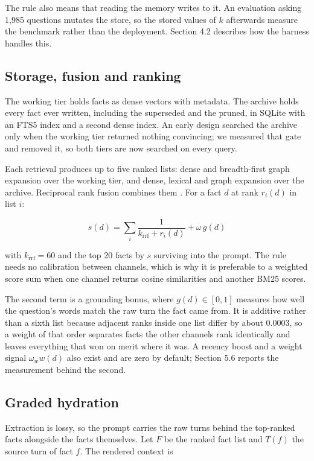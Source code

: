 \documentclass[10pt,a4paper,twocolumn]{article}
\begin{document}
The rule also means that reading the memory writes to it. An evaluation asking 1,985 questions mutates the store, so the stored values of $k$ afterwards measure the benchmark rather than the deployment. Section 4.2 describes how the harness handles this.

\subsection{Storage, fusion and ranking}

The working tier holds facts as dense vectors with metadata. The archive holds every fact ever written, including the superseded and the pruned, in SQLite with an FTS5 index and a second dense index. An early design searched the archive only when the working tier returned nothing convincing; we measured that gate and removed it, so both tiers are now searched on every query.

Each retrieval produces up to five ranked lists: dense and breadth-first graph expansion over the working tier, and dense, lexical and graph expansion over the archive. Reciprocal rank fusion combines them \citep{cormack2009}. For a fact $d$ at rank $r_i(d)$ in list $i$:

\begin{equation}\label{equation:rrf}
s(d) = \sum_{i} \frac{1}{k_{\mathrm{rrf}} + r_i(d)} + \omega \, g(d)
\end{equation}

with $k_{\mathrm{rrf}} = 60$ and the top 20 facts by $s$ surviving into the prompt. The rule needs no calibration between channels, which is why it is preferable to a weighted score sum when one channel returns cosine similarities and another BM25 scores.

The second term is a grounding bonus, where $g(d) \in [0, 1]$ measures how well the question's words match the raw turn the fact came from. It is additive rather than a sixth list because adjacent ranks inside one list differ by about 0.0003, so a weight of that order separates facts the other channels rank identically and leaves everything that won on merit where it was. A recency boost and a weight signal $\omega_w w(d)$ also exist and are zero by default; Section 5.6 reports the measurement behind the second.

\subsection{Graded hydration}

Extraction is lossy, so the prompt carries the raw turns behind the top-ranked facts alongside the facts themselves. Let $F$ be the ranked fact list and $T(f)$ the source turn of fact $f$. The rendered context is
\end{document}

